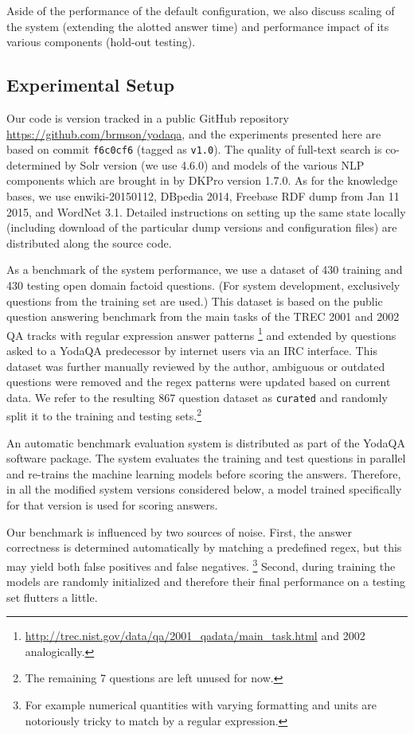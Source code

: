 Aside of the performance of the default configuration, we also discuss
scaling of the system (extending the alotted answer time) and performance
impact of its various components (hold-out testing).

\subsection{Experimental Setup}

Our code is version tracked in a public GitHub repository
\url{https://github.com/brmson/yodaqa}, and the experiments presented
here are based on commit \texttt{f6c0cf6} (tagged as \texttt{v1.0}).
The quality of full-text search is co-determined by Solr version
(we use 4.6.0) and models of the various NLP components which are brought
in by DKPro version 1.7.0.
As for the knowledge bases, we use enwiki-20150112, DBpedia 2014,
Freebase RDF dump from Jan 11 2015, and WordNet 3.1.
Detailed instructions on setting up the same state locally (including
download of the particular dump versions and configuration files) are
distributed along the source code.

As a benchmark of the system performance, we use a dataset of 430 training
and 430 testing open domain factoid questions.
(For system development, exclusively questions from the training set are used.)
This dataset is based on the public question answering benchmark from
the main tasks of the TREC 2001 and 2002 QA tracks
with regular expression answer patterns%
\footnote{\url{http://trec.nist.gov/data/qa/2001_qadata/main_task.html} and 2002 analogically.}
and extended by questions asked
to a YodaQA predecessor by internet users via an IRC interface.
This dataset was further manually reviewed by the author,
ambiguous or outdated questions were removed
and the regex patterns were updated based on current data.
We refer to the resulting 867 question dataset as \texttt{curated} and
randomly split it to the training and testing sets.\footnote{The remaining
7 questions are left unused for now.}

An automatic benchmark evaluation system is distributed as part of the
YodaQA software package.  The system evaluates the training and test questions
in parallel and re-trains the machine learning models before scoring the answers.
Therefore, in all the modified system versions considered below, a model trained
specifically for that version is used for scoring answers.

Our benchmark is influenced by two sources of noise.
First, the answer correctness is determined automatically by matching a predefined regex,
but this may yield both false positives and false negatives.%
\footnote{For example numerical quantities with varying formatting and units are notoriously tricky to match by a regular expression.}
Second, during training the models are randomly initialized and therefore their final
performance on a testing set flutters a little.

